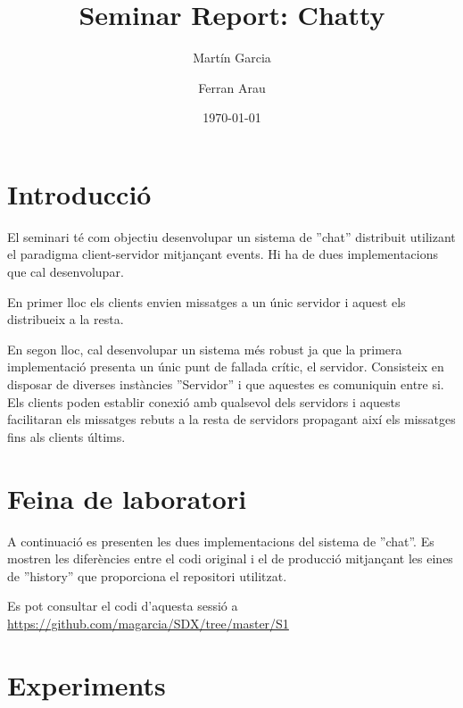 \documentclass[a4paper, 11pt]{article}
\title{Seminar Report: Chatty}
\author{Martín Garcia \and Ferran Arau}
\date{\today{}}
\begin{document}
\maketitle

\section{Introducció}


El seminari té com objectiu desenvolupar un sistema de ''chat'' distribuit
utilizant el paradigma client-servidor mitjançant events. Hi ha de dues
implementacions que cal desenvolupar.

En primer lloc els clients envien missatges a un únic servidor i aquest els
distribueix a la resta. 

En segon lloc, cal desenvolupar un sistema més robust ja que la primera
implementació presenta un únic punt de fallada crític, el servidor. Consisteix
en disposar de diverses instàncies ''Servidor'' i que aquestes es comuniquin
entre si. Els clients poden establir conexió amb qualsevol dels servidors i
aquests facilitaran els missatges rebuts a la resta de servidors propagant així
els missatges fins als clients últims.

\section{Feina de laboratori}


A continuació es presenten les dues implementacions del sistema de ''chat''. Es
mostren les diferències entre el codi original i el de producció mitjançant les
eines de ''history'' que proporciona el repositori utilitzat. 

Es pot consultar el codi d'aquesta sessió a
\url{https://github.com/magarcia/SDX/tree/master/S1}

\section{Experiments}

\end{document}
